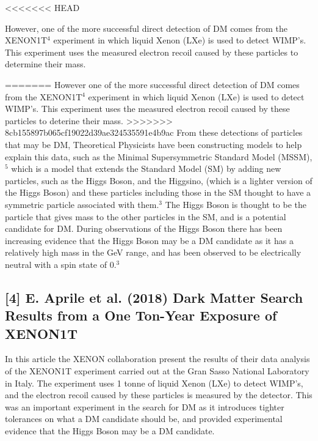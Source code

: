 \documentclass[]{article}
\begin{document}
<<<<<<< HEAD
\par
However, one of the more successful direct detection of DM comes from the 
XENON1T$^4$ experiment in which liquid Xenon (LXe) is used to detect WIMP's.
This experiment uses the measured electron recoil caused by these particles
to determine their mass. 
\par
=======
\parskip 0.2cm
However one of the more successful direct detection of DM comes from the 
XENON1T$^4$ experiment in which liquid Xenon (LXe) is used to detect WIMP's.
This experiment uses the measured electron recoil caused by these particles
to deterine their mass. 
\parskip 0.2cm
>>>>>>> 8cb155897b065cf19022d39ae324535591e4b9ac
From these detections of particles that may be DM, Theoretical Physicists have
been constructing models to help explain this data, such as the Minimal Supersymmetric
Standard Model (MSSM),$^5$ which is a model that extends the Standard Model (SM) by
adding new particles, such as the Higgs Boson, and the Higgsino, (which is a
lighter version of the Higgs Boson) and these particles including those in the SM 
thought to have a symmetric particle associated with them.$^3$ The Higgs Boson is thought to be the particle
that gives mass to the other particles in the SM, and is a potential 
candidate for DM. During observations of the Higgs Boson there has been increasing
evidence that the Higgs Boson may be a DM candidate
as it has a relatively high mass in the GeV range, and has been observed
to be electrically neutral with a spin state of 0.$^3$
\parskip 0.2cm
\newpage
\noindent 
\subsection*{[4] E. Aprile et al. (2018) Dark Matter Search Results from a One Ton-Year Exposure of XENON1T}

\parskip 0.2cm
In this article the XENON collaboration present the results of their data analysis
of the XENON1T experiment carried out at the Gran Sasso National Laboratory in Italy.
The experiment uses  1 tonne of liquid Xenon (LXe) to detect WIMP's, and the 
electron recoil caused by these particles is measured by the detector. This was an 
important experiment in the search for DM as it introduces tighter tolerances on what 
a DM candidate should be, and provided experimental evidence that the Higgs Boson
may be a DM candidate.\parskip 0.2cm

\noindent 
\end{document}
